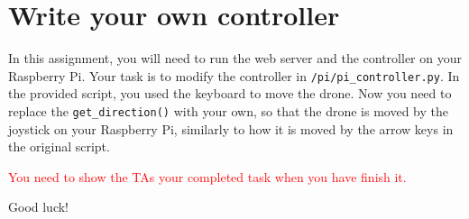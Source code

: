 \documentclass{article}
\begin{document}
\section{Write your own controller}
In this assignment, you will need to run the web server and the controller on your Raspberry Pi. Your task is to modify the controller in \texttt{/pi/pi\_controller.py}. In the provided script, you used the keyboard to move the drone. Now you need to replace the \texttt{get\_direction()} with your own, so that the drone is moved by the joystick on your Raspberry Pi, similarly to how it is moved by the arrow keys in the original script. {\textcolor{red}{You need to show the TAs your completed task when you have finish it.}

\vspace{1cm}
\begin{center}
\huge Good luck!
\end{center}

}
\end{document}
